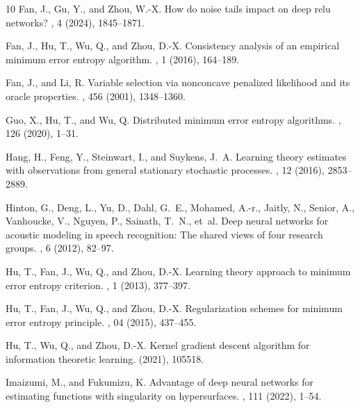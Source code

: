 \documentclass[10pt,twoside]{article}
\numberwithin{equation}{section}
\begin{document}
\begin{thebibliography}{10}
{\sc Fan, J., Gu, Y., and Zhou, W.-X.}
\newblock How do noise tails impact on deep relu networks?
, 4 (2024), 1845--1871.

{\sc Fan, J., Hu, T., Wu, Q., and Zhou, D.-X.}
\newblock Consistency analysis of an empirical minimum error entropy algorithm.
, 1 (2016),
  164--189.

{\sc Fan, J., and Li, R.}
\newblock Variable selection via nonconcave penalized likelihood and its oracle
  properties.
, 456 (2001),
  1348--1360.

{\sc Guo, X., Hu, T., and Wu, Q.}
\newblock Distributed minimum error entropy algorithms.
, 126 (2020), 1--31.

{\sc Hang, H., Feng, Y., Steinwart, I., and Suykens, J.~A.}
\newblock Learning theory estimates with observations from general stationary
  stochastic processes.
, 12 (2016), 2853--2889.

{\sc Hinton, G., Deng, L., Yu, D., Dahl, G.~E., Mohamed, A.-r., Jaitly, N.,
  Senior, A., Vanhoucke, V., Nguyen, P., Sainath, T.~N., et~al.}
\newblock Deep neural networks for acoustic modeling in speech recognition: The
  shared views of four research groups.
, 6 (2012), 82--97.

{\sc Hu, T., Fan, J., Wu, Q., and Zhou, D.-X.}
\newblock Learning theory approach to minimum error entropy criterion.
, 1 (2013),
  377--397.

{\sc Hu, T., Fan, J., Wu, Q., and Zhou, D.-X.}
\newblock Regularization schemes for minimum error entropy principle.
, 04 (2015), 437--455.

{\sc Hu, T., Wu, Q., and Zhou, D.-X.}
\newblock Kernel gradient descent algorithm for information theoretic learning.
 (2021), 105518.

{\sc Imaizumi, M., and Fukumizu, K.}
\newblock Advantage of deep neural networks for estimating functions with
  singularity on hypersurfaces.
, 111 (2022), 1--54.


\end{thebibliography}
\end{document}
